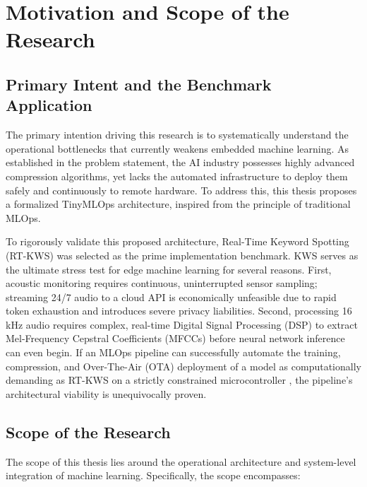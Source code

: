 \documentclass[11pt,a4paper,openany]{book}
\begin{document}
\section{Motivation and Scope of the Research}

\subsection{Primary Intent and the Benchmark Application}
The primary intention driving this research is to systematically understand the operational bottlenecks that currently weakens embedded machine learning. As established in the problem statement, the AI industry possesses highly advanced compression algorithms, yet lacks the automated infrastructure to deploy them safely and continuously to remote hardware. To address this, this thesis proposes a formalized TinyMLOps architecture, inspired from the principle of traditional MLOps.

To rigorously validate this proposed architecture, Real-Time Keyword Spotting (RT-KWS) was selected as the prime implementation benchmark. KWS serves as the ultimate stress test for edge machine learning for several reasons. First, acoustic monitoring requires continuous, uninterrupted sensor sampling; streaming 24/7 audio to a cloud API is economically unfeasible due to rapid token exhaustion \cite{2} and introduces severe privacy liabilities. Second, processing 16 kHz audio requires complex, real-time Digital Signal Processing (DSP) to extract Mel-Frequency Cepstral Coefficients (MFCCs) before neural network inference can even begin. If an MLOps pipeline can successfully automate the training, compression, and Over-The-Air (OTA) deployment of a model as computationally demanding as RT-KWS on a strictly constrained microcontroller \cite{3}, the pipeline's architectural viability is unequivocally proven.

\subsection{Scope of the Research}
The scope of this thesis lies around the operational architecture and system-level integration of machine learning. Specifically, the scope encompasses:
\end{document}
